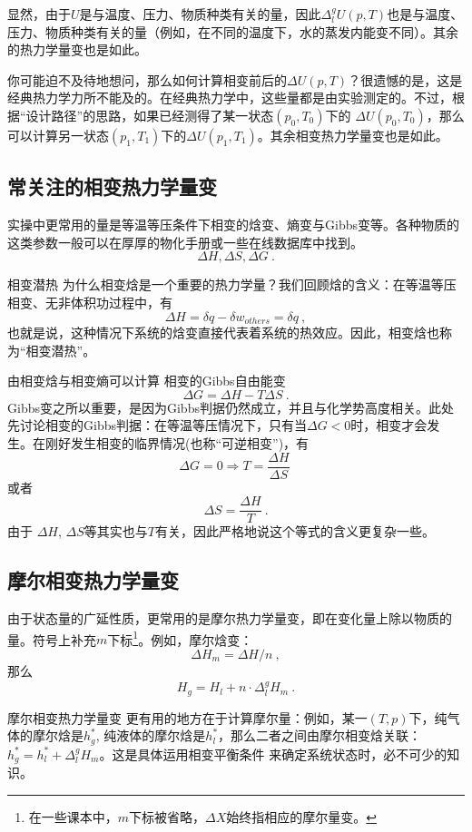 显然，由于$U$是与温度、压力、物质种类有关的量，因此$\Delta ^ g_l U (p,T)$也是与温度、压力、物质种类有关的量（例如，在不同的温度下，水的蒸发内能变不同）。其余的热力学量变也是如此。

你可能迫不及待地想问，那么如何计算相变前后的$\Delta U (p,T)$？很遗憾的是，这是经典热力学力所不能及的。在经典热力学中，这些量都是由实验测定的。不过，根据“设计路径”的思路，如果已经测得了某一状态$(p_0,T_0)$下的 $\Delta U (p_0,T_0)$，那么可以计算另一状态$(p_1,T_1)$下的$\Delta U (p_1,T_1)$。其余相变热力学量变也是如此。

\subsection{常关注的相变热力学量变}
实操中更常用的量是等温等压条件下相变的焓变、熵变与Gibbs变等。各种物质的这类参数一般可以在厚厚的物化手册或一些在线数据库中找到。
$$
\Delta H, \Delta  S, \Delta G~.
$$

\begin{example}{相变潜热}
为什么相变焓是一个重要的热力学量？我们回顾焓的含义：在等温等压相变、无非体积功过程中，有
$$
\Delta H = \delta q - \delta w_{others} = \delta q~,
$$
也就是说，这种情况下系统的焓变直接代表着系统的热效应。因此，相变焓也称为“相变潜热”。
\end{example}

由相变焓与相变熵可以计算 相变的Gibbs自由能变
$$
\Delta G = \Delta H - T \Delta S~.
$$
Gibbs变之所以重要，是因为Gibbs判据仍然成立，并且与化学势高度相关。此处先讨论相变的Gibbs判据：在等温等压情况下，只有当$\Delta G<0$时，相变才会发生。在刚好发生相变的临界情况(也称“可逆相变”)，有
$$
\Delta G = 0 \Rightarrow T = \frac{\Delta H}{\Delta S}~
$$
或者
$$
\Delta S = \frac{\Delta H}{T}~.
$$
由于 $\Delta H$, $\Delta S$等其实也与$T$有关，因此严格地说这个等式的含义更复杂一些。

\subsection{摩尔相变热力学量变}
由于状态量的广延性质，更常用的是摩尔热力学量变，即在变化量上除以物质的量。符号上补充$m$下标\footnote{在一些课本中，$m$下标被省略，$\Delta X$始终指相应的摩尔量变。}。例如，摩尔焓变：
$$
\Delta H_m = \Delta H / n~,
$$
那么
$$
H_g = H_l + n \cdot \Delta^g_l H_m~.
$$

摩尔相变热力学量变 更有用的地方在于计算摩尔量：例如，某一$(T,p)$下，纯气体的摩尔焓是$h^*_g$, 纯液体的摩尔焓是$h^*_l$，那么二者之间由摩尔相变焓关联：$h^*_g = h^*_l + \Delta^g_l H_m$。这是具体运用相变平衡条件 来确定系统状态时，必不可少的知识。

